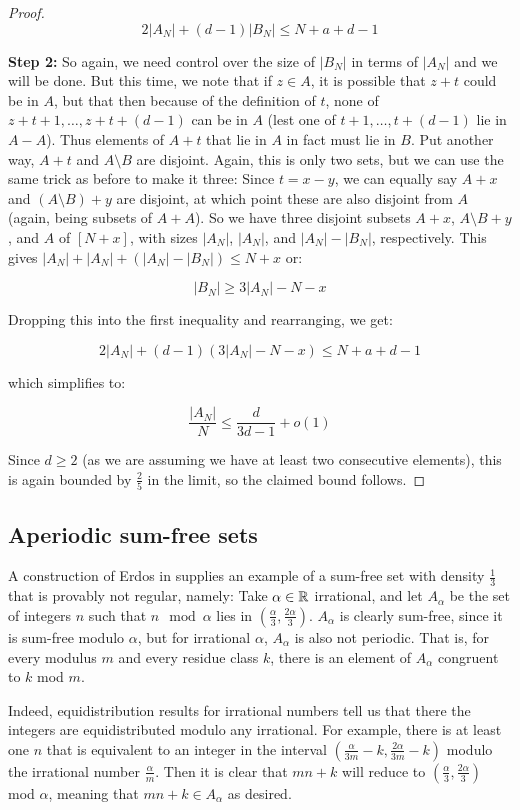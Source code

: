 \documentclass{report}
\theoremstyle{remark}
\numberwithin{equation}{section}
\begin{document}
\begin{proof}
\[2|A_N|+(d-1)|B_N| \leq N+a+d-1\]

\textbf{Step 2: }So again, we need control over the size of $|B_N|$ in
terms of $|A_N|$ and we will be done.  But this time, we note that if
$z \in A$, it is possible that $z+t$ could be in $A$, but that then
because of the definition of $t$, none of $z+t+1, \ldots, z+t+(d-1)$
can be in $A$ (lest one of $t+1, \ldots, t+(d-1)$ lie in $A-A$).  Thus
elements of $A+t$ that lie in $A$ in fact must lie in $B$.  Put another
way, $A+t$ and $A \setminus B$ are disjoint.  Again, this is only two
sets, but we can use the same trick as before to make it three: Since
$t = x-y$, we can equally say $A+x$ and $(A \setminus B) + y$ are
disjoint, at which point these are also disjoint from $A$ (again,
being subsets of $A+A$).  So we have three disjoint subsets $A+x$,
$A \setminus B + y$, and $A$ of $[N+x]$, with sizes $|A_N|$, $|A_N|$,
and $|A_N|-|B_N|$, respectively.  This gives
$|A_N| + |A_N| + (|A_N| - |B_N|) \leq N+x$ or:

\[|B_N| \geq 3|A_N|-N-x\]

Dropping this into the first inequality and rearranging, we get:

\[2|A_N|+(d-1)(3|A_N|-N-x) \leq N+a+d-1\]

which simplifies to: 

\[\frac{|A_N|}{N} \leq \frac{d}{3d-1} + o(1)\]

Since $d \geq 2$ (as we are assuming we have at least two consecutive
elements), this is again bounded by $\frac25$ in the limit, so the
claimed bound follows.
\end{proof}

\subsection{Aperiodic sum-free sets}

A construction of Erdos in \cite{erdos:spm1965} supplies an example of
a sum-free set with density $\frac13$ that is provably not regular,
namely: Take $\alpha \in \mathbb{R}$ irrational, and let $A_\alpha$ be the set
of integers $n$ such that $n \mod{\alpha}$ lies in
$\left(\frac \alpha 3, \frac {2\alpha}{3}\right)$.  $A_\alpha$ is
clearly sum-free, since it is sum-free modulo $\alpha$, but for
irrational $\alpha$, $A_\alpha$ is also not periodic.  That is, for
every modulus $m$ and every residue class $k$, there is an element of
$A_\alpha$ congruent to $k$ mod $m$.

Indeed, equidistribution results for irrational numbers tell us that
there the integers are equidistributed modulo any irrational.  For
example, there is at least one $n$ that is equivalent to an integer in
the interval $\left(\frac{\alpha}{3m}-k,\frac{2\alpha}{3m}-k\right)$
modulo the irrational number $\frac{\alpha}{m}$.  Then it is clear
that $mn+k$ will reduce to
$\left(\frac{\alpha}{3},\frac{2\alpha}{3}\right)$ mod $\alpha$,
meaning that $mn+k \in A_\alpha$ as desired.
\end{document}
